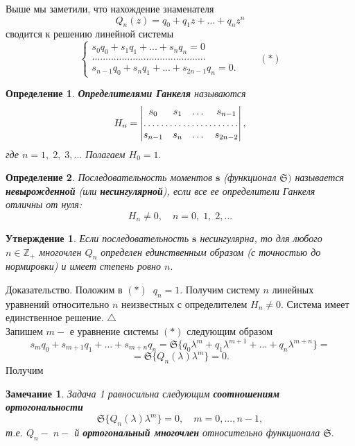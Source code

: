 \documentclass[12 pt, a4 paper]{article}
\theoremstyle{plain}   \newtheorem{Pro}{Задача}
\newtheorem{Sta}{Утверждение}
\newtheorem{Def}{Определение}
\newtheorem{Rem}{Замечание}
\begin{document}
Выше мы заметили, что нахождение знаменателя
$$
  Q_n (z)=q_0 +q_1 z+...+q_n z^n
$$
сводится к решению линейной системы
\begin{equation*}
  \begin{cases}
    s_0 q_0 +s_1 q_1 +...+s_n q_n =0\\
	..........................................\\
	s_{n-1}q_0 +s_n q_1 +...+s_{2n-1}q_n =0.
  \end{cases}
  \qquad (\ast )
\end{equation*}
\begin{Def}
{\bfseries Определителями Ганкеля}
называются
\begin{equation*}
  H_n =
    \begin{vmatrix}
	  s_0 & s_1 & \dots & s_{n-1}\\
	  \hdotsfor{4}\\
	  s_{n-1} & s_n & \dots & s_{2n-2}
	\end{vmatrix},
\end{equation*}
где
$ n=1, \; 2, \; 3,... $
Полагаем
$ H_0 =1. $
\end{Def}
\begin{Def}
Последовательность моментов
$ \mathbf{s} $
(функционал
$ \mathfrak{S}) $
называется
{\bfseries невырожденной}
(или
{\bfseries несингулярной}),
если все ее определители Ганкеля отличны от нуля:
$$
  H_n \not = 0, \quad n=0, \; 1, \; 2,...
$$
\end{Def}
\begin{Sta}
Если последовательность
$ \mathbf{s} $
несингулярна, то для любого
$ n \in \mathbb{Z}_+ $
многочлен
$ Q_n $
определен единственным образом (с точностью до нормировки) и
имеет степень ровно
$ n. $
\end{Sta}
{\Large Доказательство.}
Положим в
$ (\ast ) \; \; q_n =1. $
Получим систему
$ n $
линейных уравнений относительно
$ n $
неизвестных с определителем
$ H_n \not = 0. $
Система имеет единственное решение.
$ \triangle $
\\

Запишем
$ m- $
е уравнение системы
$ ( \ast ) $
следующим образом
$$
  s_m q_0 +s_{m+1} q_1 +...+s_{m+n} q_n =
  \mathfrak{S} \{ q_0 \lambda ^m +q_1 \lambda ^{m+1}+...+
  q_n \lambda ^{m+n} \} =
$$
$$
  =\mathfrak{S} \{ Q_n (\lambda ) \lambda ^m \}=0.
$$
Получим
\begin{Rem}
Задача 1 равносильна следующим
{\bfseries соотношениям ортогональности}
$$
  \mathfrak{S} \{ Q_n (\lambda ) \lambda ^m \} =0,
  \quad m=0,...,n-1,
$$
т.е.
$ Q_n - \; n- $
й
{\bfseries ортогональный многочлен}
относительно функционала
$ \mathfrak{S}. $
\end{Rem}
$ \; $
\\
\end{document}
